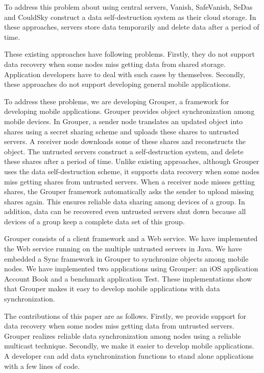 \documentclass[twocolumn,10pt]{article}
\begin{document}
To address this problem about using central servers, Vanish\cite{geambasu2009vanish}, SafeVanish\cite{zeng2010safevanish}, SeDas\cite{zeng2012sedas} and CouldSky\cite{zeng2015cloudsky} construct a data self-destruction system as their cloud storage.
In these approaches, servers store data temporarily and delete data after a period of time.

These existing approaches have following problems.
Firstly, they do not support data recovery when some nodes miss getting data from shared storage.
Application developers have to deal with such cases by themselves.
Secondly, these approaches do not support developing general mobile applications.

To address these problems, we are developing Grouper, a framework for developing mobile applications. 
Grouper provides object synchronization among mobile devices.
In Grouper, a sender node translates an updated object into shares using a secret sharing scheme and uploads these shares to untrusted servers. 
A receiver node downloads some of these shares and reconstructs the object.
The untrusted servers construct a self-destruction system, and delete these shares after a period of time.
Unlike existing approaches, although Grouper uses the data self-destruction scheme, it supports data recovery when some nodes miss getting shares from untrusted servers.
When a receiver node misses getting shares, the Grouper framework automatically asks the sender to upload missing shares again.
This ensures reliable data sharing among devices of a group.
In addition, data can be recovered even untrusted servers shut down because all devices of a group keep a complete data set of this group.

Grouper consists of a client framework and a Web service.
We have implemented the Web service running on the multiple untrusted servers in Java. 
We have embedded a Sync framework in Grouper to synchronize objects among mobile nodes.
We have implemented two applications using Grouper: an iOS application Account Book and a benchmark application Test.
These implementations show that Grouper makes it easy to develop mobile applications with data synchronization.

The contributions of this paper are as follows.
Firstly, we provide support for data recovery when some nodes miss getting data from untrusted servers.
Grouper realizes reliable data synchronization among nodes using a reliable multicast technique.
Secondly, we make it easier to develop mobile applications.
A developer can add data synchronization functions to stand alone applications with a few lines of code.
\end{document}
